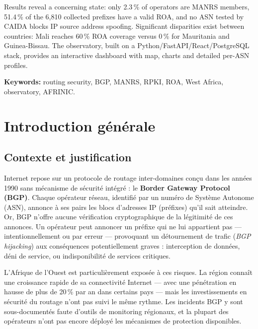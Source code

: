 \documentclass{eneam}
\begin{document}
Results reveal a concerning state: only 2.3\,\% of operators are MANRS members, 51.4\,\% of the 6,810 collected prefixes have a valid ROA, and no ASN tested by CAIDA blocks IP source address spoofing. Significant disparities exist between countries: Mali reaches 60\,\% ROA coverage versus 0\,\% for Mauritania and Guinea-Bissau. The observatory, built on a Python/FastAPI/React/PostgreSQL stack, provides an interactive dashboard with map, charts and detailed per-ASN profiles.

\textbf{Keywords:} routing security, BGP, MANRS, RPKI, ROA, West Africa, observatory, AFRINIC.


\newpage
{}
\frontmatter

\chapter*{Introduction générale}

\section{Contexte et justification}

Internet repose sur un protocole de routage inter-domaines conçu dans les années 1990 sans mécanisme de sécurité intégré : le \textbf{Border Gateway Protocol (BGP)}. Chaque opérateur réseau, identifié par un numéro de Système Autonome (ASN), annonce à ses pairs les blocs d'adresses IP (préfixes) qu'il sait atteindre. Or, BGP n'offre aucune vérification cryptographique de la légitimité de ces annonces. Un opérateur peut annoncer un préfixe qui ne lui appartient pas --- intentionnellement ou par erreur --- provoquant un détournement de trafic (\textit{BGP hijacking}) aux conséquences potentiellement graves : interception de données, déni de service, ou indisponibilité de services critiques.

L'Afrique de l'Ouest est particulièrement exposée à ces risques. La région connaît une croissance rapide de sa connectivité Internet --- avec une pénétration en hausse de plus de 20\,\% par an dans certains pays --- mais les investissements en sécurité du routage n'ont pas suivi le même rythme. Les incidents BGP y sont sous-documentés faute d'outils de monitoring régionaux, et la plupart des opérateurs n'ont pas encore déployé les mécanismes de protection disponibles.
\end{document}
